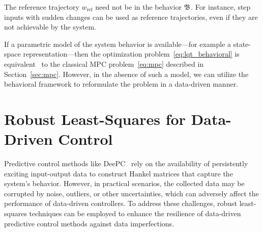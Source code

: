 \begin{Note}
    The reference trajectory $w_{\textrm{ref}}$ need not be in the behavior $\mathfrak{B}$. For instance, step inputs with sudden changes can be used as reference trajectories, even if they are not achievable by the system.
\end{Note}

If a parametric model of the system behavior is available---for example a state-space representation---then the optimization problem~\eqref{eq:lqt_behavioral} is equivalent~\cite{jeremy2019} to the classical MPC problem~\eqref{eq:mpc} described in Section~\ref{sec:mpc}. However, in the absence of such a model, we can utilize the behavioral framework to reformulate the problem in a data-driven manner.

\section{Robust Least-Squares for Data-Driven Control}
Predictive control methods like DeePC~\cite{jeremy2019} rely on the availability of persistently exciting input-output data to construct Hankel matrices that capture the system's behavior. However, in practical scenarios, the collected data may be corrupted by noise, outliers, or other uncertainties, which can adversely affect the performance of data-driven controllers. To address these challenges, robust least-squares techniques can be employed to enhance the resilience of data-driven predictive control methods against data imperfections.

